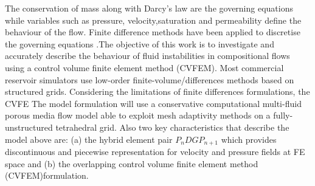 \documentclass[preprint,authoryear,12pt]{elsarticle}
\newcommand{\red}{\textcolor{red}}
\begin{document}
The conservation of mass along with Darcy's law are the governing equations while variables such as pressure, velocity,saturation and permeability define the behaviour of the flow. Finite difference methods have been applied to discretise the governing equations \citep{Luo2016,Moortgat2016,Hoteit2008} .The objective of this work is to investigate and accurately describe the behaviour of fluid instabilities in compositional flows using a control volume finite element method (CVFEM). Most commercial reservoir simulators use low-order finite-volume/differences methods based on structured grids. Considering the limitations of finite differences formulations, the CVFE The model formulation will use a conservative computational multi-fluid porous media flow model able to exploit mesh adaptivity methods on a fully-unstructured tetrahedral grid. Also two key characteristics that describe the model above are: (a) the hybrid element pair $P_{n}DGP_{n+1}$ which provides discontinuous and piecewise representation for velocity and pressure fields at FE space and (b) the overlapping control volume finite element method (CVFEM)formulation.



 
\end{document}
